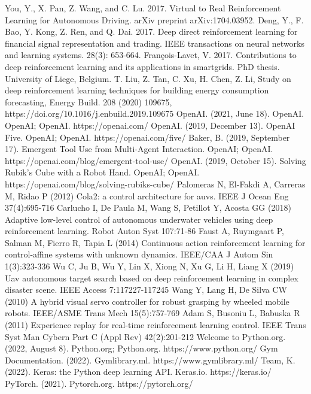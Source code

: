 \documentclass[12pt,twoside,a4]{mwbk}
\begin{document}
\begin{thebibliography}{9}
 You, Y., X. Pan, Z. Wang, and C. Lu. 2017. Virtual to Real Reinforcement Learning for Autonomous Driving. arXiv preprint arXiv:1704.03952.
 Deng, Y., F. Bao, Y. Kong, Z. Ren, and Q. Dai. 2017. Deep direct reinforcement learning for financial signal representation and trading. IEEE transactions on neural networks and learning systems. 28(3): 653-664.
 François-Lavet, V. 2017. Contributions to deep reinforcement learning and its applications in smartgrids. PhD thesis. University of Liege, Belgium.
 T. Liu, Z. Tan, C. Xu, H. Chen, Z. Li, Study on deep reinforcement learning techniques for building energy consumption forecasting, Energy Build. 208 (2020) 109675, https://doi.org/10.1016/j.enbuild.2019.109675
 OpenAI. (2021, June 18). OpenAI. OpenAI; OpenAI. https://openai.com/
 OpenAI. (2019, December 13). OpenAI Five. OpenAI; OpenAI. https://openai.com/five/
 Baker, B. (2019, September 17). Emergent Tool Use from Multi-Agent Interaction. OpenAI; OpenAI. https://openai.com/blog/emergent-tool-use/
 OpenAI. (2019, October 15). Solving Rubik’s Cube with a Robot Hand. OpenAI; OpenAI. https://openai.com/blog/solving-rubiks-cube/
 Palomeras N, El-Fakdi A, Carreras M, Ridao P (2012) Cola2: a control architecture for auvs. IEEE J Ocean Eng 37(4):695-716
 Carlucho I, De Paula M, Wang S, Petillot Y, Acosta GG (2018) Adaptive low-level control of autonomous underwater vehicles using deep reinforcement learning. Robot Auton Syst 107:71-86
 Faust A, Ruymgaart P, Salman M, Fierro R, Tapia L (2014) Continuous action reinforcement learning for control-affine systems with unknown dynamics. IEEE/CAA J Autom Sin 1(3):323-336
 Wu C, Ju B, Wu Y, Lin X, Xiong N, Xu G, Li H, Liang X (2019) Uav autonomous target search based on deep reinforcement learning in complex disaster scene. IEEE Access 7:117227-117245
 Wang Y, Lang H, De Silva CW (2010) A hybrid visual servo controller for robust grasping by wheeled mobile robots. IEEE/ASME Trans Mech 15(5):757-769
 Adam S, Busoniu L, Babuska R (2011) Experience replay for real-time reinforcement learning control. IEEE Trans Syst Man Cybern Part C (Appl Rev) 42(2):201-212
 Welcome to Python.org. (2022, August 8). Python.org; Python.org. https://www.python.org/
 Gym Documentation. (2022). Gymlibrary.ml. https://www.gymlibrary.ml/
 Team, K. (2022). Keras: the Python deep learning API. Keras.io. https://keras.io/
 PyTorch. (2021). Pytorch.org. https://pytorch.org/

\end{thebibliography}
\end{document}
